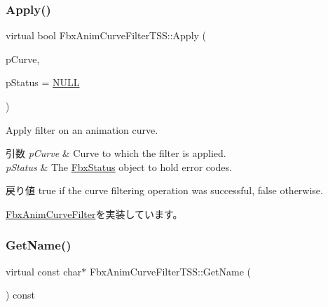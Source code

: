 \subsubsection{\texorpdfstring{Apply()}{Apply()}\hspace{0.1cm}{\footnotesize\ttfamily [5/5]}}
{\footnotesize\ttfamily virtual bool Fbx\+Anim\+Curve\+Filter\+T\+S\+S\+::\+Apply (\begin{DoxyParamCaption}\item[{\hyperlink{class_fbx_anim_curve}{Fbx\+Anim\+Curve} \&}]{p\+Curve,  }\item[{\hyperlink{class_fbx_status}{Fbx\+Status} $\ast$}]{p\+Status = {\ttfamily \hyperlink{fbxarch_8h_a070d2ce7b6bb7e5c05602aa8c308d0c4}{N\+U\+LL}} }\end{DoxyParamCaption})\hspace{0.3cm}{\ttfamily [virtual]}}

Apply filter on an animation curve. 
\begin{DoxyParams}{引数}
{\em p\+Curve} & Curve to which the filter is applied. \\
\hline
{\em p\+Status} & The \hyperlink{class_fbx_status}{Fbx\+Status} object to hold error codes. \\
\hline
\end{DoxyParams}
\begin{DoxyReturn}{戻り値}
{\ttfamily true} if the curve filtering operation was successful, {\ttfamily false} otherwise. 
\end{DoxyReturn}


\hyperlink{class_fbx_anim_curve_filter_a6a69996c47c0e6f63a0f8b0d5fa806a0}{Fbx\+Anim\+Curve\+Filter}を実装しています。

\mbox{\label{class_fbx_anim_curve_filter_t_s_s_acf96262688c855b1c9b5ead93247e758}} 
\subsubsection{\texorpdfstring{Get\+Name()}{GetName()}}
{\footnotesize\ttfamily virtual const char$\ast$ Fbx\+Anim\+Curve\+Filter\+T\+S\+S\+::\+Get\+Name (\begin{DoxyParamCaption}{ }\end{DoxyParamCaption}) const\hspace{0.3cm}{\ttfamily [virtual]}}

